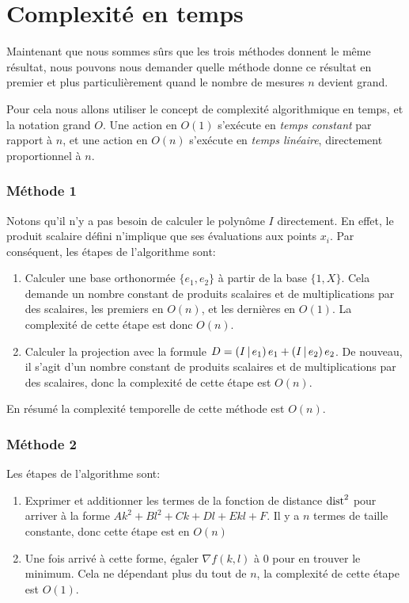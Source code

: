 \section{Complexité en temps}
\label{sec:approx-lin/temps}

Maintenant que nous sommes sûrs que les trois méthodes donnent le même
résultat, nous pouvons nous demander quelle méthode donne ce résultat
en premier et plus particulièrement quand le nombre de mesures $n$ devient
grand.

Pour cela nous allons utiliser le concept de complexité algorithmique
en temps, et la notation grand $O$.
Une action en $O(1)$ s'exécute en \emph{temps constant} par rapport à $n$,
et une action en $O(n)$ s'exécute en \emph{temps linéaire},
directement proportionnel à $n$.

\subsubsection*{Méthode 1}

Notons qu'il n'y a pas besoin de calculer le polynôme $I$ directement.
En effet, le produit scalaire défini n'implique que ses évaluations
aux points $x_i$.
Par conséquent, les étapes de l'algorithme sont:
\begin{enumerate}
    \item Calculer une base orthonormée $\{e_1,e_2\}$ à partir de la base
        $\{1,X\}$. Cela demande un nombre constant de produits scalaires
        et de multiplications par des scalaires,
        les premiers en $O(n)$, et les dernières en $O(1)$.
        La complexité de cette étape est donc $O(n)$.
    \item Calculer la projection avec la formule
        $D=\left(I\,\middle|\,e_1\right)e_1+\left(I\,\middle|\,e_2\right)e_2$.
        De nouveau, il s'agit d'un nombre constant de produits scalaires
        et de multiplications par des scalaires,
        donc la complexité de cette étape est $O(n)$.
\end{enumerate}

En résumé la complexité temporelle de cette méthode est $O(n)$.

\subsubsection*{Méthode 2}

Les étapes de l'algorithme sont:
\begin{enumerate}
    \item Exprimer et additionner les termes de la fonction de distance
        $\mathrm{dist}^2$ pour arriver à la forme $Ak^2+Bl^2+Ck+Dl+Ekl+F$.
        Il y a $n$ termes de taille constante, donc cette étape
        est en $O(n)$
    \item Une fois arrivé à cette forme, égaler $\nabla f(k,l)$ à 0
        pour en trouver le minimum.
        Cela ne dépendant plus du tout de $n$, la complexité de cette étape
        est $O(1)$.
\end{enumerate}

